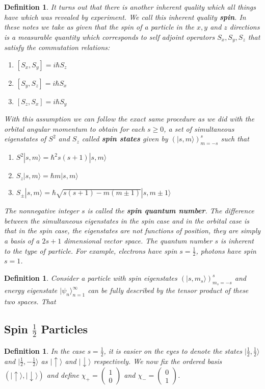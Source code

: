 \documentclass[12pt]{amsart}
\newtheorem{defn}[thm]{Definition}
\renewcommand{\r}{\rangle}
\newcommand{\up}{|\uparrow  \r}
\newcommand{\dn}{|\downarrow  \r}
\begin{document}
\begin{defn}
It turns out that there is another inherent quality which all things have which was revealed by experiment. We call this inherent quality \textbf{spin}. In these notes we take as given that the spin of a particle in the $x,y$ and $z$ directions is a measurable quantity which  corresponds to self adjoint operators $S_x, S_y, S_z$ that satisfy the commutation relations: 
\begin{enumerate}
\item $[S_x, S_y] = i\hbar S_z$
\item $[S_y, S_z] = i\hbar S_x$
\item $[S_z, S_x] = i\hbar S_y$
\end{enumerate}
With this assumption we can follow the exact same procedure as we did with the orbital angular momentum  to obtain for each $s \geq 0$, a set of simultaneous eigenstates of $S^2$ and $S_z$ called \textbf{spin states} given by $(|s, m \r)_{m=-s}^s$ such that 
\begin{enumerate}
\item $S^2|s, m \r = \hbar^2 s(s+1)|s, m \r$
\item $S_z |s, m \r = \hbar m |s, m \r$
\item $S_{\pm}|s, m \r = \hbar\sqrt{s(s+1) - m(m \pm 1)}|s, m \pm 1 \r$
\end{enumerate} 
The nonnegative integer $s$ is called the \textbf{spin quantum number}. The difference between the simultaneous eigenstates in the spin case and in the orbital case is that in the spin case, the eigenstates are not functions of position, they are simply a basis of a $2s + 1$ dimensional vector space. The quantum number $s$ is inherent to the type of particle. For example, electrons have spin $s = \frac{1}{2}$, photons have spin $s = 1$. 
\end{defn}

\begin{defn}
Consider a particle with spin eigenstates $(| s, m_s\r)_{m_s = -s}^s$ and energy eigenstate $|\psi_n \r_{n=1}^{\infty}$ can be fully described by the tensor product of these two spaces. That 
\end{defn}

\subsection{Spin $\frac{1}{2}$ Particles}

\begin{defn}
In the case $s = \frac{1}{2}$, it is easier on the eyes to denote the states $|\frac{1}{2}, \frac{1}{2} \r$ and $|\frac{1}{2}, -\frac{1}{2} \r$ as $\up$ and $\dn$ respectively. We now fix the ordered basis $(\up, \dn)$ and define $\chi_+ = \begin{pmatrix}
1 \\ 0
\end{pmatrix}$ and $\chi_- = \begin{pmatrix}
0 \\ 1
\end{pmatrix}$.   
\end{defn}
\end{document}
